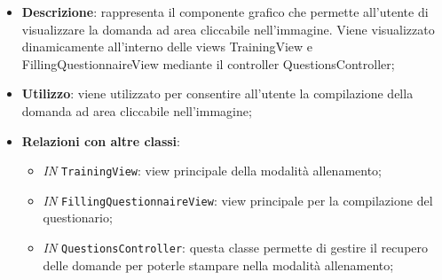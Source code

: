 		\begin{itemize}
			\item \textbf{Descrizione}: rappresenta il componente grafico che permette all'utente di visualizzare la domanda ad area cliccabile nell'immagine. Viene visualizzato dinamicamente all'interno delle views TrainingView e FillingQuestionnaireView mediante il controller QuestionsController;
			\item \textbf{Utilizzo}: viene utilizzato per consentire all'utente la compilazione della domanda ad area cliccabile nell'immagine;
			\item \textbf{Relazioni con altre classi}: 
			\begin{itemize}
				\item \textit{IN} \texttt{TrainingView}: view principale della modalità allenamento; 
				\item \textit{IN} \texttt{FillingQuestionnaireView}: view principale per la compilazione del questionario;
				\item \textit{IN} \texttt{QuestionsController}: questa classe permette di gestire il recupero delle domande per poterle stampare nella modalità allenamento;
				

\end{itemize}
\end{itemize}
